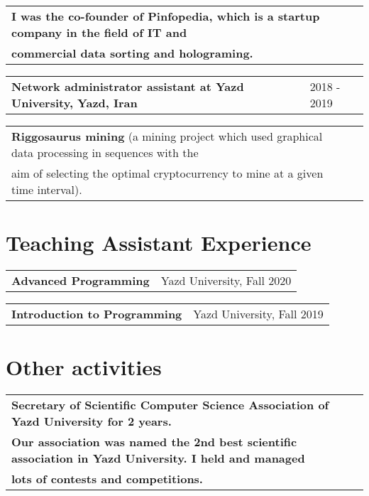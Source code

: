\documentclass[a4paper,12pt]{article}
\begin{document}
\begin{tabularx}{\linewidth}{ @{}l r@{} }
\textbf{I was the co-founder of Pinfopedia, which is a startup company in the field of IT and}\\
\textbf{commercial data sorting and holograming.} \\[2pt]
\end{tabularx}

\begin{tabularx}{\linewidth}{ @{}l X@{} }
\textbf{Network administrator assistant at Yazd University, Yazd, Iran} & \hfill 2018 - 2019 \\[2pt]
\end{tabularx}


\begin{tabularx}{\linewidth}{ @{}l r@{} }
\textbf{Riggosaurus mining}  (a mining project which used graphical data processing in sequences with the \\
aim of selecting the optimal cryptocurrency to mine at a given time interval).\\[2pt]
\end{tabularx}


\section{Teaching Assistant Experience}

\begin{tabularx}{\linewidth}{ @{}l X@{} }
\textbf{Advanced Programming} & \hfill Yazd University, Fall 2020 \\[0pt]
\end{tabularx}
\vspace{-0.7cm}

\begin{tabularx}{\linewidth}{ @{}l X@{} }
\textbf{Introduction to Programming} & \hfill Yazd University, Fall 2019 \\
\end{tabularx}
\vspace{-0.7cm}




\section{Other activities}

\begin{tabularx}{\linewidth}{ @{}l X@{} }
\textbf{Secretary of Scientific Computer Science Association of Yazd University for 2 years.}\\
\textbf{\footnotesize Our association was named the 2nd best scientific association in Yazd University. I held and managed}\\
\textbf{\footnotesize lots of contests and competitions.}\\[2pt]


\end{tabularx}
\end{document}
